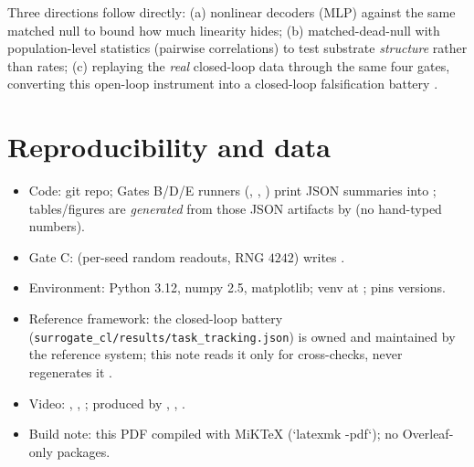 \documentclass[10pt,a4paper]{article}
\begin{document}
Three directions follow directly: (a) nonlinear decoders (MLP) against
the same matched null to bound how much linearity hides;
(b) matched-dead-null with population-level statistics (pairwise
correlations) to test substrate \emph{structure} rather than rates;
(c) replaying the \emph{real} closed-loop data through the same four
gates, converting this open-loop instrument into a closed-loop
falsification battery \cite{carmena2003,embodied_neurocomp}.

\section{Reproducibility and data}\label{sec:repro}
\begin{itemize}[nosep]
\item Code:  git repo; Gates B/D/E runners
(, , )
print JSON summaries into ; tables/figures are
\emph{generated} from those JSON artifacts by
 (no hand-typed numbers).
\item Gate C:  (per-seed random readouts,
RNG $4242$) writes .
\item Environment: Python \SI{3.12}{}, numpy \SI{2.5}{},
matplotlib; venv at ; 
pins versions.
\item Reference framework: the closed-loop battery
(\texttt{surrogate\_cl/results/task\_tracking.json}) is owned and
maintained by the reference system; this note reads it only for
cross-checks, never regenerates it \cite{embodied_neurocomp}.
\item Video: , ,
; produced by ,
, .
\item Build note: this PDF compiled with MiKTeX (`latexmk -pdf`); no
Overleaf-only packages.
\end{itemize}
\end{document}
